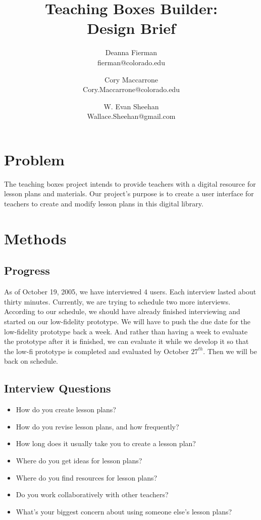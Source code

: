 \documentclass[12pt,titlepage]{article}
\title{Teaching Boxes Builder: \\ Design Brief}
\author{Deanna Fierman  \\ \small{fierman@colorado.edu} \and
        Cory Maccarrone \\ \small{Cory.Maccarrone@colorado.edu} \and
		W. Evan Sheehan \\ \small{Wallace.Sheehan@gmail.com}}
\begin{document}
\maketitle

\hfill
\thispagestyle{empty}
\pagebreak
\setcounter{page}{0}

\section{Problem}
The teaching boxes project intends to provide teachers with a digital resource
for lesson plans and materials. Our project's purpose is to create a user
interface for teachers to create and modify lesson plans in this digital
library.

\section{Methods}
\subsection{Progress}
As of October 19, 2005, we have interviewed 4 users. Each interview lasted about
thirty minutes.  Currently, we are trying to schedule two more interviews.
According to our schedule, we should have already finished interviewing and
started on our low-fidelity prototype. We will have to push the due date for the
low-fidelity prototype back a week. And rather than having a week to evaluate
the prototype after it is finished, we can evaluate it while we develop it so
that the low-fi prototype is completed and evaluated by October $27^{th}$. Then
we will be back on schedule.

\subsection{Interview Questions}
\begin{itemize}
	\item How do you create lesson plans?
	\item How do you revise lesson plans, and how frequently?
	\item How long does it usually take you to create a lesson plan?
	\item Where do you get ideas for lesson plans?
	\item Where do you find resources for lesson plans?
	\item Do you work collaboratively with other teachers?
	\item What's your biggest concern about using someone else's lesson plans?
\end{itemize}

\pagebreak
\hfill
\end{document}
